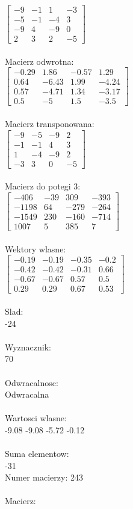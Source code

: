 \documentclass[a4paper,12pt]{article}
\begin{document}
$\begin{bmatrix} -9&-1&1&-3\\-5&-1&-4&3\\-9&4&-9&0\\2&3&2&-5 \end{bmatrix}$
\\
\\
Macierz odwrotna:\\

$\begin{bmatrix} -0.29&1.86&-0.57&1.29\\0.64&-6.43&1.99&-4.24\\0.57&-4.71&1.34&-3.17\\0.5&-5&1.5&-3.5 \end{bmatrix}$
\\
\\
Macierz transponowana:\\

$\begin{bmatrix} -9&-5&-9&2\\-1&-1&4&3\\1&-4&-9&2\\-3&3&0&-5 \end{bmatrix}$
\\
\\
Macierz do potegi 3:\\

$\begin{bmatrix} -406&-39&309&-393\\-1198&64&-279&-264\\-1549&230&-160&-714\\1007&5&385&7 \end{bmatrix}$
\\
\\
Wektory wlasne:\\

$\begin{bmatrix} -0.19&-0.19&-0.35&-0.2\\-0.42&-0.42&-0.31&0.66\\-0.67&-0.67&0.57&0.5\\0.29&0.29&0.67&0.53 \end{bmatrix}$
\\
\\
Slad:\\
-24
\\
\\
Wyznacznik:\\
70
\\
\\
Odwracalnosc:\\
Odwracalna
\\
\\
Wartosci wlasne:\\
-9.08 -9.08 -5.72 -0.12
\\
\\
Suma elementow:\\
-31
\\
\newpage
Numer macierzy:
243
\\
\\
Macierz:\\
\end{document}
